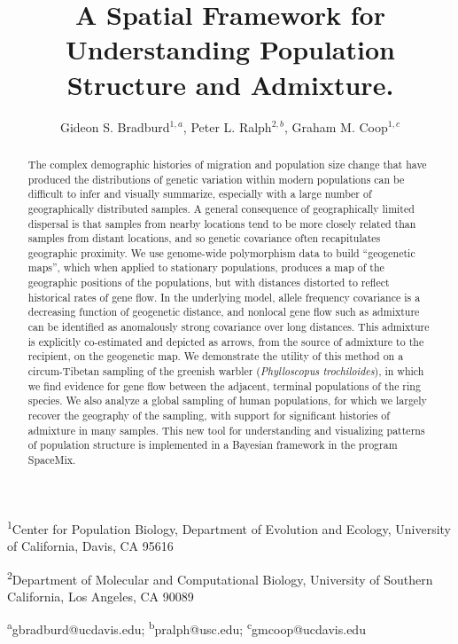 \documentclass[12pt]{article}
\title{A Spatial Framework for Understanding Population Structure and Admixture.}
\date{\vspace{-5ex}}
\author{Gideon S. Bradburd$^{1,a}$, Peter L. Ralph$^{2,b}$, Graham M. Coop$^{1,c}$}
\begin{document}
\maketitle

\textsuperscript{1}Center for Population Biology, Department of Evolution and Ecology, University of California, Davis, CA 95616

\textsuperscript{2}Department of Molecular and Computational Biology, University of Southern California, Los Angeles, CA 90089

\textsuperscript{a}gbradburd@ucdavis.edu; 
\textsuperscript{b}pralph@usc.edu;
\textsuperscript{c}gmcoop@ucdavis.edu\\\\\

\newpage
 

\begin{abstract}
The complex demographic histories of migration and population size change
that have produced the distributions of genetic variation within modern populations
can be difficult to infer and visually summarize,
especially with a large number of geographically distributed samples.
A general consequence of geographically limited dispersal
is that samples from nearby locations tend to be more closely related
than samples from distant locations,
and so genetic covariance often recapitulates geographic proximity.
We use genome-wide polymorphism data to build ``geogenetic maps'',
which when applied to stationary populations,
produces a map of the geographic positions of the populations,
but with distances distorted to reflect historical rates of gene flow.
In the underlying model, 
allele frequency covariance is a decreasing function of geogenetic distance,
and nonlocal gene flow such as admixture
can be identified as anomalously strong covariance over long distances.
This admixture is explicitly co-estimated and depicted as arrows,
from the source of admixture to the recipient, on the geogenetic map.
We demonstrate the utility of this method on a circum-Tibetan sampling of the greenish warbler (\textit{Phylloscopus trochiloides}), 
in which we find evidence for gene flow between the adjacent, terminal populations of the ring species.  
We also analyze a global sampling of human populations, for which we largely recover the geography of the sampling, 
with support for significant histories of admixture in many samples.  
This new tool for understanding and visualizing patterns of population structure
is implemented in a Bayesian framework in the program SpaceMix.
\end{abstract}
\end{document}
